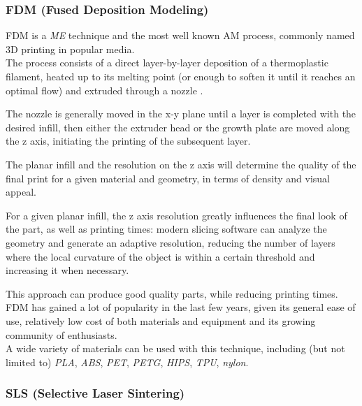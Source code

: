 \documentclass{article}
\begin{document}
    \subsubsection{FDM (Fused Deposition Modeling) \label{FDM_general}}

    FDM is a \textit{ME} technique and the most well known AM process, commonly named 3D printing in popular media. \\
    
    The process consists of a direct layer-by-layer deposition of a thermoplastic filament, heated up to its melting point (or enough to soften it until it reaches an 
    optimal flow) and extruded through a nozzle \autocites*{Recent_progress_polymers_AM}{Kovalcik_PHA_Review}. 

    The nozzle is generally moved in the x-y plane until a layer is completed with the desired infill, then either the extruder head or the growth plate are moved along the z axis, 
    initiating the printing of the subsequent layer.

    The planar infill and the resolution on the z axis will determine the quality of the final print for a given material and geometry, in terms of density and visual appeal.
    
    For a given planar infill, the z axis resolution greatly influences the final look of the part, as well as printing times:
    modern slicing software can analyze the geometry and generate an adaptive resolution, reducing the number of layers where the local  
    curvature of the object is within a certain threshold and increasing it when necessary. 
    
    This approach can produce good quality parts, 
    while reducing printing times. \\ 
    
    FDM has gained a lot of popularity in the last few years, given its general ease of use, relatively low cost of both materials and equipment and its growing 
    community of enthusiasts. \\

    A wide variety of materials can be used with this technique, including (but not limited to) 
    \textit{PLA}, \textit{ABS}, \textit{PET}, \textit{PETG}, \textit{HIPS}, \textit{TPU}, \textit{nylon}. \clearpage

    \subsubsection{SLS (Selective Laser Sintering) \label{SLS_general}}
\end{document}
